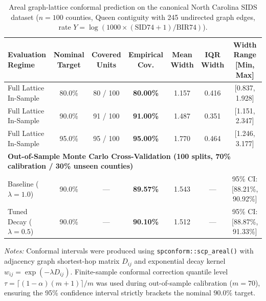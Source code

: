 \documentclass[11pt,a4paper]{article}
\begin{document}
\vspace{1.5em}

\begin{table}[htbp]
\centering
\small
\begin{threeparttable}
\caption{Areal graph-lattice conformal prediction on the canonical North Carolina SIDS dataset ($n = 100$ counties, Queen contiguity with 245 undirected graph edges, rate $Y = \log(1000 \times (\text{SID74}+1) / \text{BIR74})$).}
\label{tab:nc_sids_areal}
\begin{tabular}{lcccccc}
\toprule
\textbf{Evaluation Regime} & \textbf{Nominal Target} & \textbf{Covered Units} & \textbf{Empirical Cov.} & \textbf{Mean Width} & \textbf{IQR Width} & \textbf{Width Range [Min, Max]} \\
\midrule
Full Lattice In-Sample & 80.0\% & 80 / 100 & \textbf{80.00\%} & 1.157 & 0.416 & [0.837, 1.928] \\
Full Lattice In-Sample & 90.0\% & 91 / 100 & \textbf{91.00\%} & 1.487 & 0.351 & [1.151, 2.347] \\
Full Lattice In-Sample & 95.0\% & 95 / 100 & \textbf{95.00\%} & 1.770 & 0.464 & [1.246, 3.177] \\
\midrule
\multicolumn{7}{l}{\textbf{Out-of-Sample Monte Carlo Cross-Validation (100 splits, 70\% calibration / 30\% unseen counties)}} \\
Baseline ($\lambda = 1.0$) & 90.0\% & --- & \textbf{89.57\%} & 1.543 & --- & 95\% CI: [88.21\%, 90.92\%] \\
Tuned Decay ($\lambda = 0.5$) & 90.0\% & --- & \textbf{90.10\%} & 1.512 & --- & 95\% CI: [88.87\%, 91.33\%] \\
\bottomrule
\end{tabular}
\begin{tablenotes}[flushleft]
\footnotesize
\item \textit{Notes:} Conformal intervals were produced using \texttt{spconform::scp\_areal()} with adjacency graph shortest-hop matrix $D_{ij}$ and exponential decay kernel $w_{ij} = \exp(-\lambda D_{ij})$. Finite-sample conformal correction quantile level $\tau = \lceil (1-\alpha)(m+1) \rceil / m$ was used during out-of-sample calibration ($m=70$), ensuring the 95\% confidence interval strictly brackets the nominal $90.0\%$ target.
\end{tablenotes}
\end{threeparttable}
\end{table}
\end{document}
